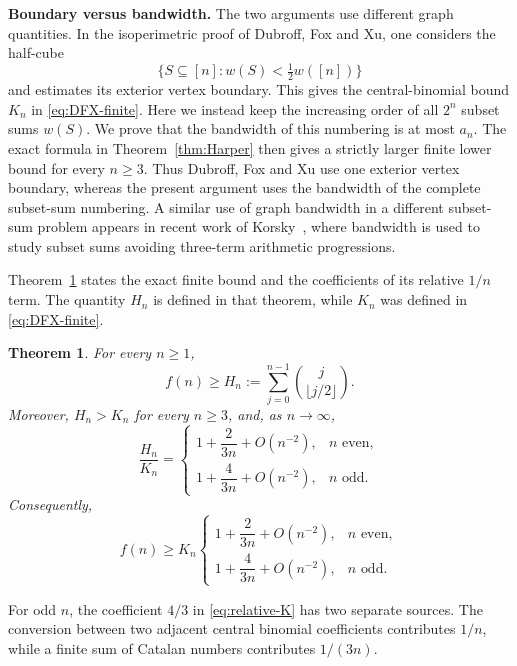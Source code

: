 \documentclass[10pt]{amsart}
\newtheorem{theorem}{Theorem}[section]
\numberwithin{equation}{section}
\begin{document}
\medskip
\noindent\textbf{Boundary versus bandwidth.}
The two arguments use different graph quantities.  In the isoperimetric proof
of Dubroff, Fox and Xu, one considers the half-cube
\[
 \{S\subseteq[n]:w(S)<\tfrac12 w([n])\}
\]
and estimates its exterior vertex boundary.  This gives the central-binomial
bound $K_n$ in \cref{eq:DFX-finite}.  Here we instead keep the increasing
order of all $2^n$ subset sums $w(S)$.  We prove that the bandwidth of this
numbering is at most $a_n$.  The exact formula in Theorem~\ref{thm:Harper} then gives
a strictly larger finite lower bound for every $n\ge3$.  Thus Dubroff, Fox and
Xu use one exterior vertex boundary, whereas the present argument uses the
bandwidth of the complete subset-sum numbering. A similar use of graph
bandwidth in a different subset-sum problem appears in recent work of
Korsky~\cite{Korsky2026}, where bandwidth is used to study subset sums avoiding
three-term arithmetic progressions.

Theorem~\ref{thm:main} states the exact finite bound and the coefficients of its
relative $1/n$ term.  The quantity $H_n$ is defined in that theorem,
while $K_n$ was defined in \cref{eq:DFX-finite}.

\begin{theorem}\label{thm:main}
For every $n\ge1$,
\begin{equation}\label{eq:main-finite}
 f(n)\ge H_n:=\sum_{j=0}^{n-1}\binom{j}{\lfloor j/2\rfloor}.
\end{equation}
Moreover, $H_n>K_n$ for every $n\ge3$, and, as $n\to\infty$,
\begin{equation}\label{eq:relative-K}
 \frac{H_n}{K_n}
 =\begin{cases}
  1+\dfrac{2}{3n}+O(n^{-2}),&n\text{ even},\\[6pt]
  1+\dfrac{4}{3n}+O(n^{-2}),&n\text{ odd}.
 \end{cases}
\end{equation}
Consequently,
\begin{equation}\label{eq:main-relative-f}
 f(n)\ge K_n
 \begin{cases}
  1+\dfrac{2}{3n}+O(n^{-2}),&n\text{ even},\\[6pt]
  1+\dfrac{4}{3n}+O(n^{-2}),&n\text{ odd}.
 \end{cases}
\end{equation}
\end{theorem}

For odd $n$, the coefficient $4/3$ in \cref{eq:relative-K} has two separate
sources.  The conversion between two adjacent central binomial coefficients
contributes $1/n$, while a finite sum of Catalan numbers contributes
$1/(3n)$.
\end{document}
